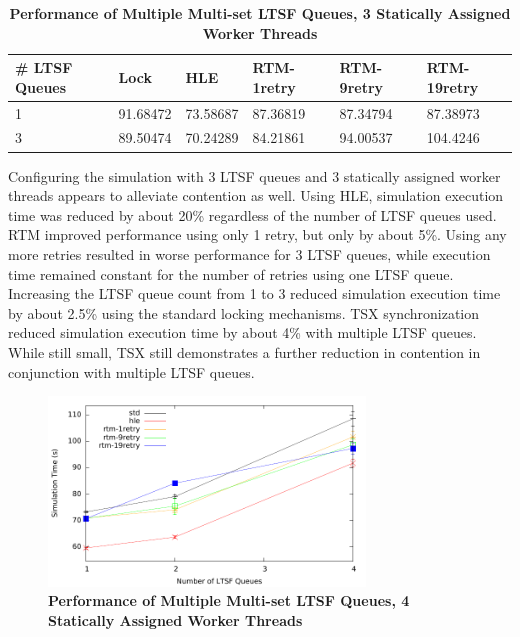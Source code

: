 \documentclass[11pt]{book}
\begin{document}
\begin{table}
    \centering
    \begin{tabular}{l|p{2cm}|p{2cm}|p{2cm}|p{2cm}|p{2cm}}
        \textbf{\# LTSF Queues}&Lock &HLE &RTM-1retry &RTM-9retry &RTM-19retry \\
        \hline
        \midrule
            1 &91.68472 &73.58687 &87.36819 &87.34794 &87.38973 \\ 
            3 &89.50474 &70.24289 &84.21861 &94.00537 &104.4246 \\
    \end{tabular}
    \caption{\textbf{Performance of Multiple Multi-set LTSF Queues, 3 Statically Assigned Worker Threads}}
    \label{tab:noThrMig_3threadsXschq}
\end{table}

Configuring the simulation with 3 LTSF queues and 3 statically assigned worker
threads appears to alleviate contention as well.  Using HLE, simulation
execution time was reduced by about 20\% regardless of the number of LTSF queues
used.  RTM improved performance using only 1 retry, but only by about 5\%.
Using any more retries resulted in worse performance for 3 LTSF queues, while
execution time remained constant for the number of retries using one LTSF queue.
Increasing the LTSF queue count from 1 to 3 reduced simulation execution time by
about 2.5\% using the standard locking mechanisms.  TSX synchronization reduced
simulation execution time by about 4\% with multiple LTSF queues.  While still
small, TSX still demonstrates a further reduction in contention in conjunction
with multiple LTSF queues.

\begin{figure}
    \centering
    \graphicspath{ {./figures/} }
    \includegraphics[width=0.75\textwidth,keepaspectratio]{hugeepidemicsim-NOmig-timeVSschedQs-multiset-4thread}
    \caption{\textbf{Performance of Multiple Multi-set LTSF Queues, 4 Statically Assigned Worker Threads}}
    \label{fig:noThrMig_timeVSschq_4threads}
\end{figure}
\end{document}
